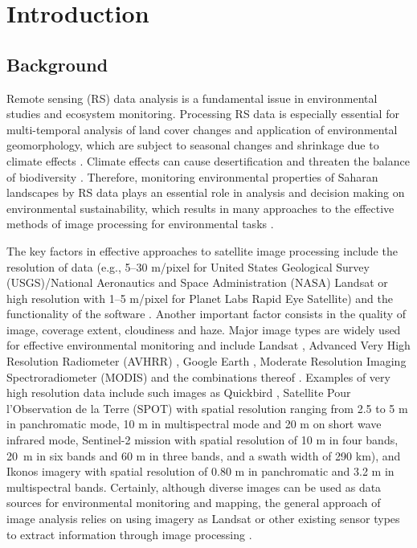 \documentclass[land,article,accept,pdftex,moreauthors]{Definitions/mdpi}
\begin{document}
\section{Introduction}

\subsection{Background}

Remote sensing (RS) data analysis is a fundamental issue in environmental studies and ecosystem monitoring. Processing RS data is especially essential for multi-temporal analysis of land cover changes \cite{BOUSSETTA2022102564} and application of environmental geomorphology, which are subject to seasonal changes and shrinkage due to climate effects \cite{JonesMillington}. Climate effects can cause desertification \cite{Pontanier,info14040249} and threaten the balance of biodiversity \cite{YAICHEACHOUR2023501}. Therefore, monitoring environmental properties of Saharan landscapes by RS data plays an essential role in analysis and decision making on environmental sustainability, which results in many approaches to the effective methods of image processing for environmental tasks \cite{Monget,Lemenkova202227,CAMPOS2018211}. 

The key factors in effective approaches to satellite image processing include the {resolution of data (e.g., 5--30 m/pixel for United States Geological Survey (USGS)/National Aeronautics and Space Administration (NASA) Landsat  or high resolution with 1--5 m/pixel for Planet Labs Rapid Eye Satellite) }and the functionality of the software \cite{rs14236017}. Another important factor consists in the quality of image, coverage extent, cloudiness and haze. Major image types {are} widely used for effective environmental monitoring and include Landsat \cite{BOUSSEMA2023185,SMIDA2022104643,jmse11040871}, Advanced Very High Resolution Radiometer (AVHRR) \cite{Bryant}, Google Earth \cite{LI2022252}, Moderate Resolution Imaging Spectroradiometer (MODIS) \cite{TOUHAMI2022103804,RHIF2022101596} and the combinations thereof \cite{REBILLARD1984133}. Examples of very high resolution data include such images as Quickbird \cite{CHOUARI2021443}, Satellite Pour l’Observation de la Terre (SPOT) {with spatial resolution ranging from 2.5 to 5 m in panchromatic mode, 10 m in multispectral mode and 20 m on short wave infrared mode, }{Sentinel-2 mission with spatial resolution of 10 m in four bands, \mbox{20 m} in six bands and 60 m in three bands, and a swath width of 290 km)}, and Ikonos {imagery with spatial resolution of 0.80 m in panchromatic and 3.2 m in multispectral bands}\cite{VELA2008591}. Certainly, although diverse images can be used {as }data sources for environmental monitoring and mapping, the general approach of image analysis relies on using imagery as Landsat or other existing sensor types to extract information through image processing \cite{LiangWang}. 
\end{document}
